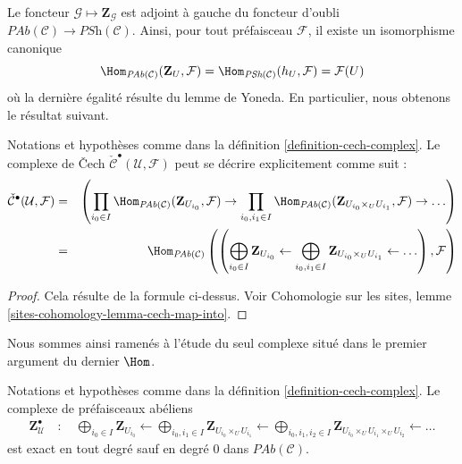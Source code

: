 \noindent
Le foncteur $\mathcal{G} \mapsto \mathbf{Z}_\mathcal{G}$ est adjoint \`a gauche du
foncteur d'oubli $\textit{PAb}(\mathcal{C}) \to \textit{PSh}(\mathcal{C})$.
Ainsi, pour tout pr\'efaisceau $\mathcal{F}$, il existe un isomorphisme canonique
$$
\Hom_{\textit{PAb}(\mathcal{C})}(\mathbf{Z}_U, \mathcal{F})
=
\Hom_{\textit{PSh}(\mathcal{C})}(h_U, \mathcal{F})
=
\mathcal{F}(U)
$$
o\`u la derni\`ere \'egalit\'e r\'esulte du lemme de Yoneda. En particulier, nous obtenons le
r\'esultat suivant.

\begin{lemma}
\label{lemma-cech-complex-describe}
Notations et hypoth\`eses comme dans la d\'efinition \ref{definition-cech-complex}.
Le complexe de {\v C}ech $\check{\mathcal{C}}^\bullet(\mathcal{U}, \mathcal{F})$
peut se d\'ecrire explicitement comme suit :
\begin{eqnarray*}
\check{\mathcal{C}}^\bullet(\mathcal{U}, \mathcal{F})
& = &
\left(
\prod_{i_0 \in I}
\Hom_{\textit{PAb}(\mathcal{C})}(\mathbf{Z}_{U_{i_0}}, \mathcal{F}) \to
\prod_{i_0, i_1 \in I}
\Hom_{\textit{PAb}(\mathcal{C})}(
\mathbf{Z}_{U_{i_0} \times_U U_{i_1}}, \mathcal{F}) \to \ldots
\right) \\
& = &
\Hom_{\textit{PAb}(\mathcal{C})}\left(
\left(
\bigoplus_{i_0 \in I} \mathbf{Z}_{U_{i_0}} \leftarrow
\bigoplus_{i_0, i_1 \in I} \mathbf{Z}_{U_{i_0} \times_U U_{i_1}} \leftarrow
\ldots
\right), \mathcal{F}\right)
\end{eqnarray*}
\end{lemma}

\begin{proof}
Cela r\'esulte de la formule ci-dessus. Voir
Cohomologie sur les sites, lemme \ref{sites-cohomology-lemma-cech-map-into}.
\end{proof}

\noindent
Nous sommes ainsi ramen\'es \`a l'\'etude du seul complexe situ\'e dans le premier argument du
dernier $\Hom$.

\begin{lemma}
\label{lemma-exact}
Notations et hypoth\`eses comme dans la d\'efinition \ref{definition-cech-complex}.
Le complexe de pr\'efaisceaux ab\'eliens
\begin{align*}
\mathbf{Z}_\mathcal{U}^\bullet \quad : \quad
\bigoplus_{i_0 \in I} \mathbf{Z}_{U_{i_0}} \leftarrow
\bigoplus_{i_0, i_1 \in I} \mathbf{Z}_{U_{i_0} \times_U U_{i_1}} \leftarrow
\bigoplus_{i_0, i_1, i_2 \in I}
\mathbf{Z}_{U_{i_0} \times_U U_{i_1} \times_U U_{i_2}} \leftarrow
\ldots
\end{align*}
est exact en tout degr\'e sauf en degr\'e $0$ dans $\textit{PAb}(\mathcal{C})$.
\end{lemma}

